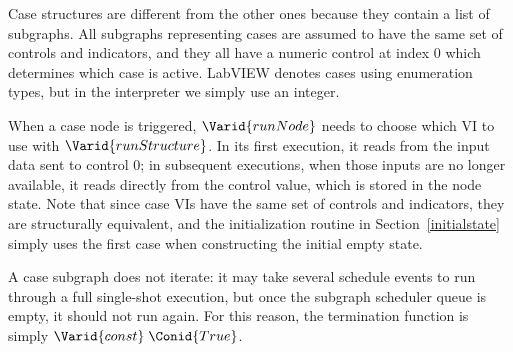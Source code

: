 \resethooks

Case structures are different from the other ones because they contain
a list of subgraphs. All subgraphs representing cases are assumed to
have the same set of controls and indicators, and they all have a
numeric control at index 0 which determines which case is active.
LabVIEW denotes cases using enumeration types, but in the interpreter
we simply use an integer.

When a case node is triggered, \ensuremath{\Varid{runNode}} needs to choose which VI to use with
\ensuremath{\Varid{runStructure}}. In its first execution, it reads from the input data sent to
control 0; in subsequent executions, when those inputs are no longer
available, it reads directly from the control value, which is stored in the
node state. Note that since case VIs have the same set of controls and
indicators, they are structurally equivalent, and the initialization routine
in Section~\ref{initialstate} simply uses the first case when constructing the
initial empty state.

A case subgraph does not iterate: it may take several schedule events to run
through a full single-shot execution, but once the subgraph scheduler queue is
empty, it should not run again. For this reason, the termination function is
simply \ensuremath{\Varid{const}\;\Conid{True}}.

